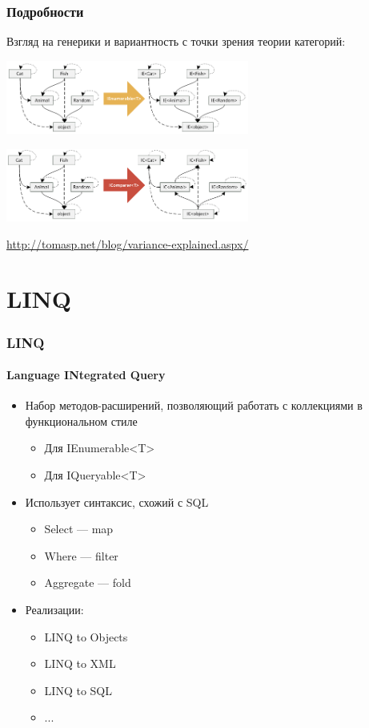 \documentclass[xetex,mathserif,serif]{beamer}
\begin{document}
	\begin{frame}
		\frametitle{Подробности}
		Взгляд на генерики и вариантность с точки зрения теории категорий:

		\begin{center}
			\includegraphics[width=0.6\textwidth]{covariantFunctors.png}

			\vspace{4mm}
			\includegraphics[width=0.6\textwidth]{contravariantFunctors.png}
		\end{center}
			
		\href{http://tomasp.net/blog/variance-explained.aspx/}{http://tomasp.net/blog/variance-explained.aspx/}
	\end{frame}

	\section{LINQ}

	\begin{frame}
		\frametitle{LINQ}
		\framesubtitle{Language INtegrated Query}
		\begin{itemize}
			\item Набор методов-расширений, позволяющий работать с коллекциями в функциональном стиле
			\begin{itemize}
				\item Для IEnumerable<T>
				\item Для IQueryable<T>
			\end{itemize}
			\item Использует синтаксис, схожий с SQL
			\begin{itemize}
				\item Select --- map
				\item Where --- filter
				\item Aggregate --- fold
			\end{itemize}
			\item Реализации:
			\begin{itemize}
				\item LINQ to Objects
				\item LINQ to XML
				\item LINQ to SQL
				\item ...
			\end{itemize}
		\end{itemize}
	\end{frame}
\end{document}
